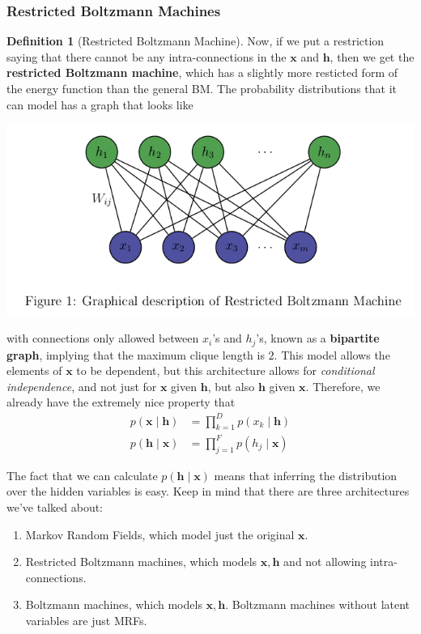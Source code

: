 \documentclass{article}
\theoremstyle{definition}
\theoremstyle{remark}
\theoremstyle{definition}
\newtheorem{definition}{Definition}[section]
\begin{document}
    \subsubsection{Restricted Boltzmann Machines} 

      \begin{definition}[Restricted Boltzmann Machine] 
        Now, if we put a restriction saying that there cannot be any intra-connections in the $\mathbf{x}$ and $\mathbf{h}$, then we get the \textbf{restricted Boltzmann machine}, which has a slightly more resticted form of the energy function than the general BM. The probability distributions that it can model has a graph that looks like 
        \begin{center}
          \includegraphics[scale=0.4]{img/rbm_layer.png}
        \end{center}
        with connections only allowed between $x_i$'s and $h_j$'s, known as a \textbf{bipartite graph}, implying that the maximum clique length is $2$. This model allows the elements of $\mathbf{x}$ to be dependent, but this architecture allows for \textit{conditional independence}, and not just for $\mathbf{x}$ given $\mathbf{h}$, but also $\mathbf{h}$ given $\mathbf{x}$. Therefore, we already have the extremely nice property that 
        \begin{align*} 
          p(\mathbf{x} \mid \mathbf{h}) & = \prod_{k=1}^{D} p(x_k \mid \mathbf{h}) \\
          p(\mathbf{h} \mid \mathbf{x}) & = \prod_{j=1}^F p(h_j \mid \mathbf{x}) 
        \end{align*}
      \end{definition}

      The fact that we can calculate $p(\mathbf{h} \mid \mathbf{x})$ means that inferring the distribution over the hidden variables is easy. Keep in mind that there are three architectures we've talked about: 
      \begin{enumerate}
        \item Markov Random Fields, which model just the original $\mathbf{x}$. 
        \item Restricted Boltzmann machines, which models $\mathbf{x}, \mathbf{h}$ and not allowing intra-connections. 
        \item Boltzmann machines, which models $\mathbf{x}, \mathbf{h}$. Boltzmann machines without latent variables are just MRFs.  
      \end{enumerate}
\end{document}
